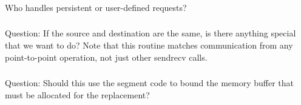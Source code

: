\documentclass{article}
\begin{document}
\subsubsection{}
\begin{adi3}
\begin{mmadi}
\begin{core}
\end{core}
\end{mmadi}
\end{adi3}
Who handles persistent or user-defined requests?

\subsubsection{}
\subsubsection{}
\subsubsection{}
\subsubsection{}
Question: If the source and destination are the same, is there anything
special that we want to do?  Note that this routine matches communication from
any point-to-point operation, not just other sendrecv calls.

\subsubsection{}
Question: Should this use the segment code to bound the memory buffer that
must be allocated for the replacement?

\subsubsection{}
\subsubsection{}
\subsubsection{}
\end{document}

